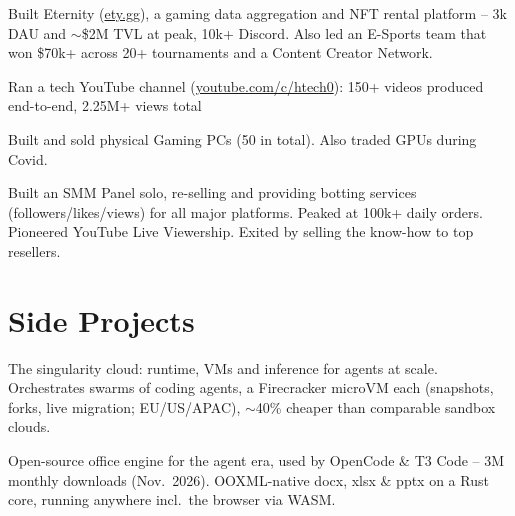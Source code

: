 \documentclass{cv-template}
\begin{document}
\vspace{0.2em}

\vspace{0.1em}

\begin{tightlist}
  \item Built Eternity (\href{https://ety.gg}{ety.gg}), a gaming data aggregation and NFT rental platform -- 3k DAU and $\sim$\$2M TVL at peak, 10k+ Discord. Also led an E-Sports team that won \$70k+ across 20+ tournaments and a Content Creator Network.
  \item Ran a tech YouTube channel (\href{https://youtube.com/c/htech0}{youtube.com/c/htech0}): 150+ videos produced end-to-end, 2.25M+ views total
  \item Built and sold physical Gaming PCs (50 in total). Also traded GPUs during Covid.
  \item Built an SMM Panel solo, re-selling and providing botting services (followers/likes/views) for all major platforms. Peaked at 100k+ daily orders. Pioneered YouTube Live Viewership. Exited by selling the know-how to top resellers.
\end{tightlist}

\section{Side Projects}

\vspace{0.1em}

The singularity cloud: runtime, VMs and inference for agents at scale. Orchestrates swarms of coding agents, a Firecracker microVM each (snapshots, forks, live migration; EU/US/APAC), $\sim$40\% cheaper than comparable sandbox clouds.

\vspace{0.2em}

\vspace{0.1em}

Open-source office engine for the agent era, used by OpenCode \& T3 Code -- 3M monthly downloads (Nov.\ 2026). OOXML-native docx, xlsx \& pptx on a Rust core, running anywhere incl.\ the browser via WASM.

\vspace{0.2em}

\vspace{0.1em}
\end{document}
